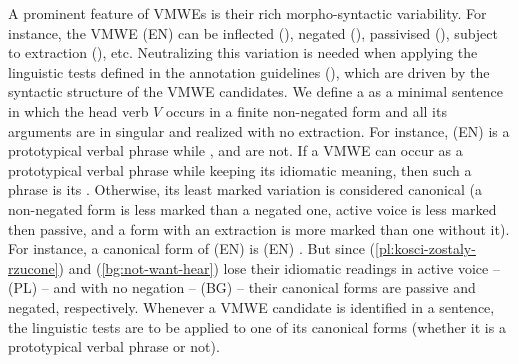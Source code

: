 \documentclass[output=paper,modfonts]{langscibook}
\begin{document}

A prominent feature of VMWEs is their rich morpho-syntactic variability. For instance, the VMWE (EN)  can be inflected (), negated (), passivised (), subject to extraction (), etc. Neutralizing this variation is needed when applying the linguistic tests defined in the annotation guidelines (), which are driven by the syntactic structure of the VMWE candidates. 
%
We define a  as a minimal sentence in which the head verb $V$ occurs in a finite non-negated form and all its arguments are in singular and realized with no extraction. For instance, (EN)  is a prototypical verbal phrase while ,  and  are not. If a VMWE can occur as a prototypical verbal phrase while keeping its idiomatic meaning, then such a phrase is its . Otherwise, its least marked variation is considered canonical (a non-negated form is less marked than a negated one, active voice is less marked then passive, and a form with an extraction is more marked than one without it). For instance, a canonical form of (EN)  is (EN) . But since (\ref{pl:kosci-zostaly-rzucone}) and (\ref{bg:not-want-hear})
lose their idiomatic readings in active voice -- (PL)  -- and with no negation -- (BG)  -- their canonical forms are passive and negated, respectively. 
Whenever a VMWE candidate is identified in a sentence, the linguistic tests are to be applied to one of its canonical forms (whether it is a prototypical verbal phrase or not).
\end{document}
